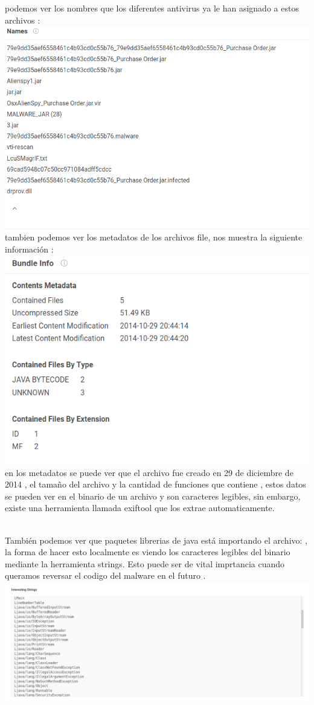 \documentclass[10pt,a4paper]{article} %
\begin{document}
                    podemos ver los nombres que los diferentes antivirus ya le han asignado a estos archivos : 
                    \\ \includegraphics[width=0.5\linewidth]{names.png}
                    \\ tambien podemos ver los metadatos de los archivos file, nos muestra la siguiente información :
                    \\ \includegraphics[width=0.8\linewidth]{metadata.png}
                    \\ en los metadatos se puede ver que el archivo fue creado
                    en 29 de diciembre de 2014 , el tamaño del archivo y la
                    cantidad de funciones que contiene , estos datos se pueden
                    ver en el binario de un archivo y son caracteres legibles,
                    sin embargo, existe una herramienta llamada exiftool que
                    los extrae automaticamente. 
                    
                    \\ También podemos ver que paquetes librerias de java está
                    importando el archivo: , la forma de hacer esto  
                    localmente es viendo los caracteres legibles del
                    binario mediante la herramienta strings. Esto puede ser de
                    vital imprtancia cuando queramos reversar el codigo del
                    malware en el futuro .
                    \\ \includegraphics[width=0.9\linewidth]{librerias.png}
                    \\  
\end{document}
